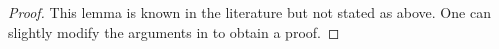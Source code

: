 \documentclass[12pt]{article}
\numberwithin{equation}{section}
\begin{document}
\begin{proof}
This lemma is known in the literature but not stated as above. One can slightly modify the arguments in \cite[Prop. 3.2]{LY2020} to obtain a proof.
\end{proof}

%	
\end{document}

